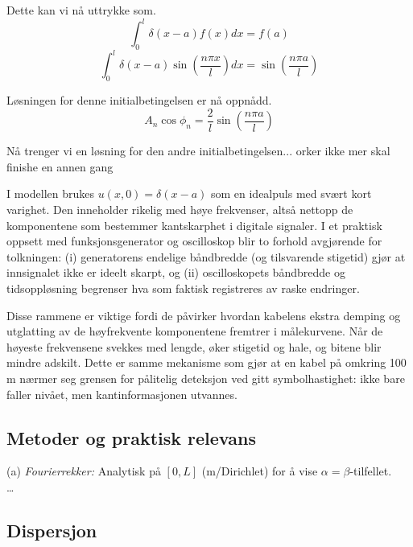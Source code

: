 Dette kan vi nå uttrykke som.
\begin{equation}
    \int_{0}^{l} \delta (x-a) f(x) dx = f(a)
\end{equation}
\begin{equation}
    \int_{0}^{l} \delta (x-a) \sin{\left( \frac{n \pi x}{l} \right)} dx = \sin{\left( \frac{n \pi a}{l} \right)}
\end{equation}

Løsningen for denne initialbetingelsen er nå oppnådd.
\begin{equation}
    A_n \cos{\phi_n} = \frac{2}{l} \sin{\left( \frac{n \pi a}{l} \right)}
\end{equation}

Nå trenger vi en løsning for den andre initialbetingelsen... orker ikke mer skal finishe en annen gang

\clearpage


I modellen brukes \(u(x,0)=\delta(x-a)\) som en idealpuls med svært kort varighet. Den inneholder rikelig med høye frekvenser, altså nettopp de komponentene som bestemmer kantskarphet i digitale signaler. I et praktisk oppsett med funksjonsgenerator og oscilloskop blir to forhold avgjørende for tolkningen: (i) generatorens endelige båndbredde (og tilsvarende stigetid) gjør at innsignalet ikke er ideelt skarpt, og (ii) oscilloskopets båndbredde og tidsoppløsning begrenser hva som faktisk registreres av raske endringer. 

Disse rammene er viktige fordi de påvirker hvordan kabelens ekstra demping og utglatting av de høyfrekvente komponentene fremtrer i målekurvene. Når de høyeste frekvensene svekkes med lengde, øker stigetid og hale, og bitene blir mindre adskilt. Dette er samme mekanisme som gjør at en kabel på omkring 100\,m nærmer seg grensen for pålitelig deteksjon ved gitt symbolhastighet: ikke bare faller nivået, men kantinformasjonen utvannes.





\subsection{Metoder og praktisk relevans}

(a) \textit{Fourierrekker:} Analytisk på $[0,L]$ (m/Dirichlet) for å vise $\alpha=\beta$-tilfellet.\\
\dots
\clearpage
\subsection{Dispersjon}

